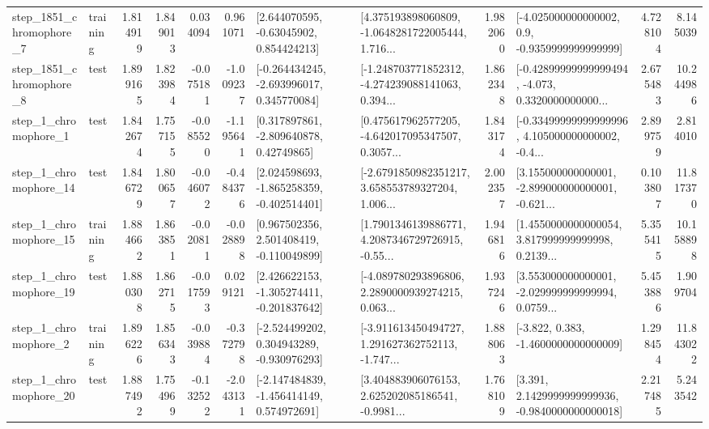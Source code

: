 \begin{tabular}{llrrrrllrlrr}
  step\_1851\_chromophore\_7 &  training &      1.814919 &    1.849013 &      0.034094 &  0.961071 &     [2.644070595, -0.63045902, 0.854424213] &  [4.375193898060809, -1.0648281722005444, 1.716... &       1.982060 &     [-4.025000000000002, 0.9, -0.9359999999999999] &            4.728104 &          8.145039 \\
  step\_1851\_chromophore\_8 &      test &      1.899165 &    1.823984 &     -0.075181 & -1.009237 &   [-0.264434245, -2.693996017, 0.345770084] &  [-1.248703771852312, -4.274239088141063, 0.394... &       1.862348 &  [-0.42899999999999494, -4.073, 0.3320000000000... &            2.675483 &         10.244986 \\
     step\_1\_chromophore\_1 &      test &      1.842674 &    1.757155 &     -0.085520 & -1.195641 &     [0.317897861, -2.809640878, 0.42749865] &  [0.475617962577205, -4.642017095347507, 0.3057... &       1.843174 &  [-0.33499999999999996, 4.105000000000002, -0.4... &            2.899759 &          2.814010 \\
    step\_1\_chromophore\_14 &      test &      1.846729 &    1.800657 &     -0.046072 & -0.484376 &   [2.024598693, -1.865258359, -0.402514401] &  [-2.6791850982351217, 3.658553789327204, 1.006... &       2.002357 &  [3.155000000000001, -2.899000000000001, -0.621... &            0.103807 &         11.817370 \\
    step\_1\_chromophore\_15 &  training &      1.884662 &    1.863851 &     -0.020811 & -0.028898 &    [0.967502356, 2.501408419, -0.110049899] &  [1.7901346139886771, 4.2087346729726915, -0.55... &       1.946816 &  [1.4550000000000054, 3.817999999999998, 0.2139... &            5.355415 &         10.158898 \\
    step\_1\_chromophore\_19 &      test &      1.880308 &    1.862715 &     -0.017593 &  0.029121 &   [2.426622153, -1.305274411, -0.201837642] &  [-4.089780293896806, 2.2890000939274215, 0.063... &       1.937246 &  [3.553000000000001, -2.029999999999994, 0.0759... &            5.453886 &          1.909704 \\
     step\_1\_chromophore\_2 &  training &      1.896226 &    1.856343 &     -0.039884 & -0.372798 &   [-2.524499202, 0.304943289, -0.930976293] &  [-3.911613450494727, 1.291627362752113, -1.747... &       1.888063 &               [-3.822, 0.383, -1.4600000000000009] &            1.298454 &         11.843022 \\
    step\_1\_chromophore\_20 &      test &      1.887492 &    1.754969 &     -0.132522 & -2.043131 &   [-2.147484839, -1.456414149, 0.574972691] &  [3.404883906076153, 2.625202085186541, -0.9981... &       1.768109 &   [3.391, 2.1429999999999936, -0.9840000000000018] &            2.217485 &          5.243542 \\

\end{tabular}
